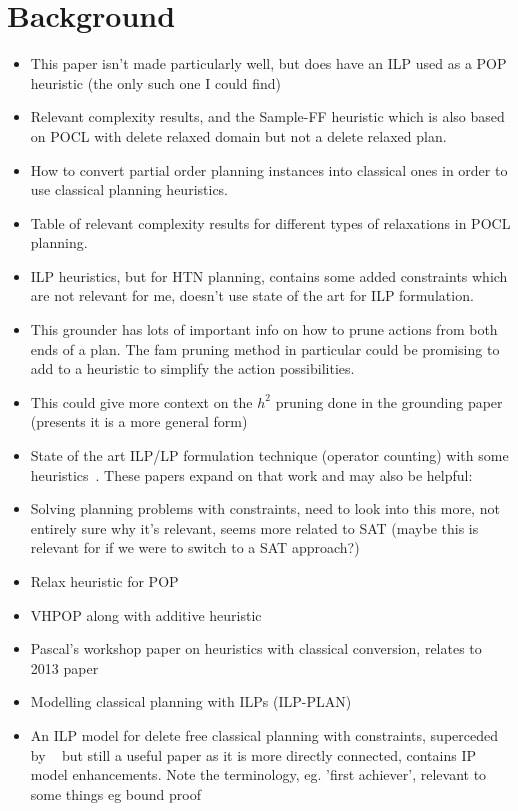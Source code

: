 \documentclass[runningheads]{llncs}
\begin{document}
\section{Background}
\begin{itemize}
    \item This paper isn't made particularly well, but does have an ILP used as a POP heuristic (the only such one I could find)~\cite{Bylander1997ILP}
    \item Relevant complexity results, and the Sample-FF heuristic which is also based on POCL with delete relaxed domain but not a delete relaxed plan.~\cite{Bercher2013POCL-DeleteRelaxation}
    \item How to convert partial order planning instances into classical ones in order to use classical planning heuristics. ~\cite{Bercher2013POCLHeuristicsViaEncoding}
    \item Table of relevant complexity results for different types of relaxations in POCL planning.~\cite{Bercher2021POCLComplexities}
    \item ILP heuristics, but for HTN planning, contains some added constraints which are not relevant for me, doesn't use state of the art for ILP formulation.~\cite{Hoeller2020ILP}
    \item This grounder has lots of important info on how to prune actions from both ends of a plan. The fam pruning method in particular could be promising to add to a heuristic to simplify the action possibilities.~\cite{fivser2020lifted}
    \item This could give more context on the $h^2$ pruning done in the grounding paper (presents it is a more general form)~\cite{haslum2009hm}
    \item State of the art ILP/LP formulation technique (operator counting) with some heuristics~\cite{pommerening2014lp}. These papers expand on that work and may also be helpful:~\cite{pommerening2015non}~\cite{pommerening2015heuristics}~\cite{roger2015linear}
    \item Solving planning problems with constraints, need to look into this more, not entirely sure why it's relevant, seems more related to SAT (maybe this is relevant for if we were to switch to a SAT approach?)~\cite{singh2023lifted}
    \item Relax heuristic for POP ~\cite{nguyen2001reviving}
    \item VHPOP along with additive heuristic ~\cite{younes2003vhpop}
    \item Pascal's workshop paper on heuristics with classical conversion, relates to 2013 paper~\cite{Bercher13EncodingPlans}
    \item Modelling classical planning with ILPs (ILP-PLAN) ~\cite{kautz2000integer}
    \item An ILP model for delete free classical planning with constraints, superceded by ~\cite{pommerening2014lp} but still a useful paper as it is more directly connected, contains IP model enhancements. Note the terminology, eg. 'first achiever', relevant to some things eg bound proof~\cite{imai2015practical}
\end{itemize}
\end{document}
